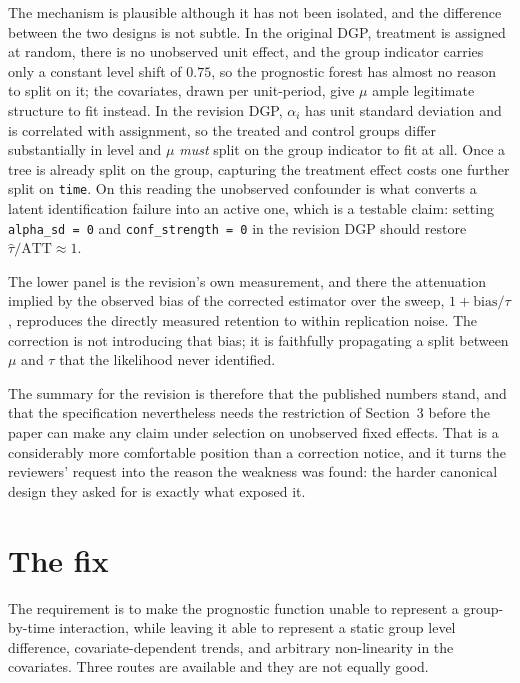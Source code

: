 \documentclass[11pt]{article}
\newcommand{\att}{\mathrm{ATT}}
\begin{document}
The mechanism is plausible although it has not been isolated, and the
difference between the two designs is not subtle. In the original DGP,
treatment is assigned at random, there is no unobserved unit effect, and the
group indicator carries only a constant level shift of $0.75$, so the
prognostic forest has almost no reason to split on it; the covariates, drawn
per unit-period, give $\mu$ ample legitimate structure to fit instead. In the
revision DGP, $\alpha_i$ has unit standard deviation and is correlated with
assignment, so the treated and control groups differ substantially in level and
$\mu$ \emph{must} split on the group indicator to fit at all. Once a tree is
already split on the group, capturing the treatment effect costs one further
split on \texttt{time}. On this reading the unobserved confounder is what
converts a latent identification failure into an active one, which is a
testable claim: setting \texttt{alpha\_sd = 0} and \texttt{conf\_strength = 0}
in the revision DGP should restore $\hat\tau/\att \approx 1$.

The lower panel is the revision's own measurement, and there the attenuation
implied by the observed bias of the corrected estimator over the sweep,
$1 + \mathrm{bias}/\tau$, reproduces the directly measured retention to within
replication noise. The correction is not introducing that bias; it is
faithfully propagating a split between $\mu$ and $\tau$ that the likelihood
never identified.

The summary for the revision is therefore that the published numbers stand, and
that the specification nevertheless needs the restriction of Section~3 before
the paper can make any claim under selection on unobserved fixed effects. That
is a considerably more comfortable position than a correction notice, and it
turns the reviewers' request into the reason the weakness was found: the harder
canonical design they asked for is exactly what exposed it.

\section{The fix}

The requirement is to make the prognostic function unable to represent a
group-by-time interaction, while leaving it able to represent a static group
level difference, covariate-dependent trends, and arbitrary non-linearity in
the covariates. Three routes are available and they are not equally good.
\end{document}
